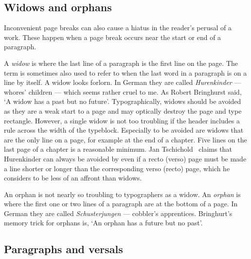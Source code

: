 \documentclass[10pt,letterpaper,extrafontsizes]{memoir}
\begin{document}





\subsection{Widows and orphans}

    Inconvenient page breaks can also cause a hiatus in the reader's perusal
of a work. These happen when a page break occurs near the start or end of
a paragraph. 

    A \emph{widow} is where the last line of a 
paragraph is the first line on the page. The term is 
sometimes also used to refer to when the last word in a 
paragraph is on a line by itself. A widow looks forlorn.
In German they are called \textit{Hurenkinder} --- 
whores' children --- which seems rather cruel to me.
As Robert Bringhurst said, `A widow has a past but no future'. 
Typographically, widows should be avoided as they are a weak start to a page 
and may optically destroy the page and type rectangle. However, a single widow
is not too troubling if the header includes a rule across the width of the 
typeblock. Especially to be 
avoided are widows that are the only line on a page, for example at the end 
of a chapter. Five lines on the last page of a 
chapter is a reasonable minimum. 
Jan Tschichold~\autocite{TSCHICHOLD91} claims that Hurenkinder can always 
be avoided by even if a recto (verso) page must be made a line shorter or
longer than the corresponding verso (recto) page, which he considers to be 
less of an affront than widows.

    An orphan is not nearly so troubling to typographers as a 
widow. An \emph{orphan} is where the first one or two lines of a 
paragraph are at the bottom of a page. In German they are 
called \textit{Schusterjungen} --- cobbler's apprentices.
Bringhurt's memory trick for orphans is, `An orphan has a future but no 
past'. 

\subsection{Paragraphs and versals} \label{sec:versal}
\end{document}
